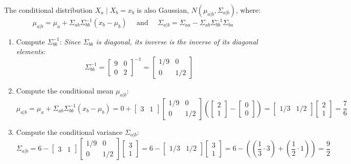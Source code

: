 \documentclass{article}
\begin{document}
The conditional distribution $X_a \mid X_b = x_b$ is also Gaussian, $N(\mu_{a|b}, \Sigma_{a|b})$, where:
$$\mu_{a|b} = \mu_a + \Sigma_{ab} \Sigma_{bb}^{-1} (x_b - \mu_b) \quad \text{ and } \quad \Sigma_{a|b} = \Sigma_{aa} - \Sigma_{ab} \Sigma_{bb}^{-1} \Sigma_{ba}$$
\begin{enumerate}
    \item Compute $\Sigma_{bb}^{-1}$: \textit{Since $\Sigma_{bb}$ is diagonal, its inverse is the inverse of its diagonal elements:}
    $$ \Sigma_{bb}^{-1} = \begin{bmatrix} 9 & 0 \\ 0 & 2 \end{bmatrix}^{-1} = \begin{bmatrix} 1/9 & 0 \\ 0 & 1/2 \end{bmatrix} $$
    \item Compute the conditional mean $\mu_{a|b}$:
    $$\mu_{a|b} = \mu_a + \Sigma_{ab} \Sigma_{bb}^{-1} (x_b - \mu_b) = 0 + \begin{bmatrix} 3 & 1 \end{bmatrix} \begin{bmatrix} 1/9 & 0 \\ 0 & 1/2 \end{bmatrix} \left( \begin{bmatrix} 2 \\ 1 \end{bmatrix} - \begin{bmatrix} 0 \\ 0 \end{bmatrix} \right) = \begin{bmatrix} 1/3 & 1/2 \end{bmatrix} \begin{bmatrix} 2 \\ 1 \end{bmatrix} = \frac{7}{6}$$
    \item Compute the conditional variance $\Sigma_{a|b}$:
    $$\Sigma_{a|b} = 6 - \begin{bmatrix} 3 & 1 \end{bmatrix} \begin{bmatrix} 1/9 & 0 \\ 0 & 1/2 \end{bmatrix} \begin{bmatrix} 3 \\ 1 \end{bmatrix} = 6 - \begin{bmatrix} 1/3 & 1/2 \end{bmatrix} \begin{bmatrix} 3 \\ 1 \end{bmatrix} = 6 - \left( \left(\frac{1}{3} \cdot 3\right) + \left(\frac{1}{2} \cdot 1\right) \right) = \frac{9}{2}$$
\end{enumerate}
\end{document}
